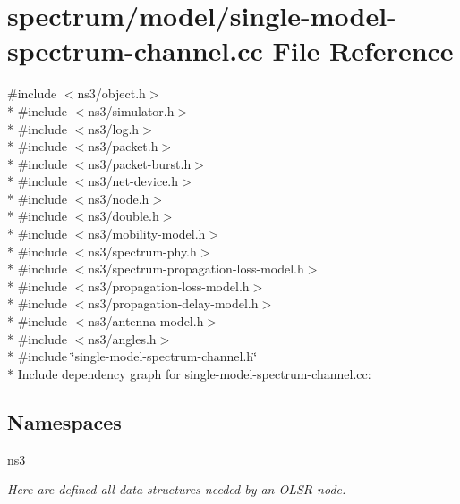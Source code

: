 \hypertarget{single-model-spectrum-channel_8cc}{}\section{spectrum/model/single-\/model-\/spectrum-\/channel.cc File Reference}
\label{single-model-spectrum-channel_8cc}
{\ttfamily \#include $<$ns3/object.\+h$>$}\\*
{\ttfamily \#include $<$ns3/simulator.\+h$>$}\\*
{\ttfamily \#include $<$ns3/log.\+h$>$}\\*
{\ttfamily \#include $<$ns3/packet.\+h$>$}\\*
{\ttfamily \#include $<$ns3/packet-\/burst.\+h$>$}\\*
{\ttfamily \#include $<$ns3/net-\/device.\+h$>$}\\*
{\ttfamily \#include $<$ns3/node.\+h$>$}\\*
{\ttfamily \#include $<$ns3/double.\+h$>$}\\*
{\ttfamily \#include $<$ns3/mobility-\/model.\+h$>$}\\*
{\ttfamily \#include $<$ns3/spectrum-\/phy.\+h$>$}\\*
{\ttfamily \#include $<$ns3/spectrum-\/propagation-\/loss-\/model.\+h$>$}\\*
{\ttfamily \#include $<$ns3/propagation-\/loss-\/model.\+h$>$}\\*
{\ttfamily \#include $<$ns3/propagation-\/delay-\/model.\+h$>$}\\*
{\ttfamily \#include $<$ns3/antenna-\/model.\+h$>$}\\*
{\ttfamily \#include $<$ns3/angles.\+h$>$}\\*
{\ttfamily \#include \char`\"{}single-\/model-\/spectrum-\/channel.\+h\char`\"{}}\\*
Include dependency graph for single-\/model-\/spectrum-\/channel.cc\+:
\subsection*{Namespaces}
\begin{DoxyCompactItemize}
\item 
 \hyperlink{namespacens3}{ns3}
\begin{DoxyCompactList}\small\item\em Here are defined all data structures needed by an O\+L\+SR node. \end{DoxyCompactList}\end{DoxyCompactItemize}
